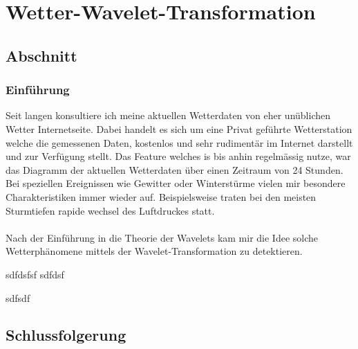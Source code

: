 %
%
%
\chapter{Wetter-Wavelet-Transformation\label{chapter:wwt}}
\begin{refsection}

\section{Abschnitt}
\subsection{Einführung}

Seit langen konsultiere ich meine aktuellen Wetterdaten von eher unüblichen Wetter Internetseite.
Dabei handelt es sich um eine Privat geführte Wetterstation welche die gemessenen Daten, kostenlos und sehr rudimentär im Internet darstellt und zur Verfügung stellt.
Das Feature welches is bis anhin regelmässig nutze, war das Diagramm der aktuellen Wetterdaten über einen Zeitraum von 24 Stunden.
Bei speziellen Ereignissen wie Gewitter oder Winterstürme vielen mir besondere Charakteristiken immer wieder auf.
Beispielsweise traten bei den meisten Sturmtiefen rapide wechsel des Luftdruckes statt.
\\
\\
Nach der Einführung in die Theorie der Wavelets kam mir die Idee solche Wetterphänomene mittels der Wavelet-Transformation zu detektieren.



sdfdsfsf
sdfdsf

sdfsdf

\section{Schlussfolgerung}

\printbibliography[heading=subbibliography]
\end{refsection}
